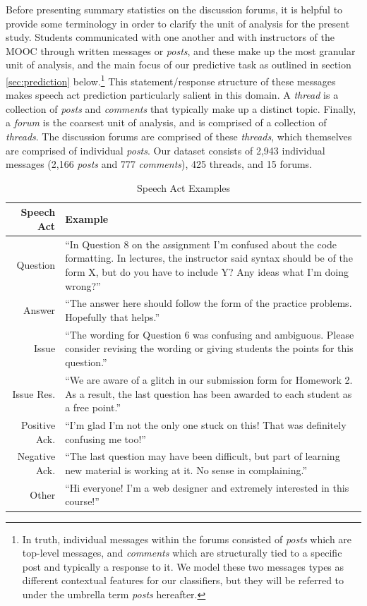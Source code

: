 \documentclass[twoside]{article}
\begin{document}
Before presenting summary statistics on the discussion forums, it is helpful to provide some terminology in order to clarify the unit of analysis for the present study. Students communicated with one another and with instructors of the MOOC through written messages or \textit{posts}, and these make up the most granular unit of analysis, and the main focus of our predictive task as outlined in section \ref{sec:prediction} below.\footnote{In truth, individual messages within the forums consisted of \textit{posts} which are top-level messages, and \textit{comments} which are structurally tied to a specific post and typically a response to it. We model these two messages types as different contextual features for our classifiers, but they will be referred to under the umbrella term \textit{posts} hereafter.} This statement/response structure of these messages makes speech act prediction particularly salient in this domain. A \textit{thread} is a collection of \textit{posts} and \textit{comments} that typically make up a distinct topic. Finally, a \textit{forum} is the coarsest unit of analysis, and is comprised of a collection of \textit{threads}. The discussion forums are comprised of these \textit{threads}, which themselves are comprised of individual \textit{posts}. Our dataset consists of 2,943 individual messages (2,166 \textit{posts} and 777 \textit{comments}), 425 threads, and 15 forums.

\begin{table}[h]
\centering
{\footnotesize
\begin{tabular*} {0.7\textwidth} {r |p{6.3cm}}
Speech Act & Example\\\hline
Question & ``In Question 8 on the assignment I'm confused about the code formatting. In lectures, the instructor said syntax should be of the form X, but do you have to include Y? Any ideas what I'm doing wrong?'' \\ \hline
Answer & ``The answer here should follow the form of the practice problems. Hopefully that helps.'' \\ \hline
Issue & ``The wording for Question 6 was confusing and ambiguous. Please consider revising the wording or giving students the points for this question.'' \\ \hline
Issue Res. & ``We are aware of a glitch in our submission form for Homework 2. As a result, the last question has been awarded to each student as a free point.'' \\ \hline
Positive Ack. & ``I'm glad I'm not the only one stuck on this! That was definitely confusing me too!'' \\ \hline
Negative Ack. & ``The last question may have been difficult, but part of learning new material is working at it. No sense in complaining.'' \\ \hline
Other & ``Hi everyone!  I'm a web designer and extremely interested in this course!''
\end{tabular*}}
\caption{Speech Act Examples}
\vspace{-15pt}
\label{table:speech-acts}
\end{table}
\end{document}

